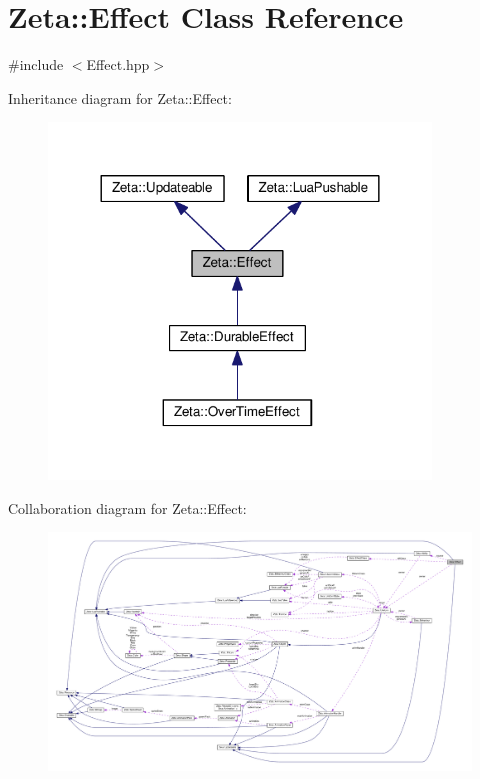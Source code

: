 \hypertarget{classZeta_1_1Effect}{\section{Zeta\+:\+:Effect Class Reference}
\label{classZeta_1_1Effect}
}


{\ttfamily \#include $<$Effect.\+hpp$>$}



Inheritance diagram for Zeta\+:\+:Effect\+:\nopagebreak
\begin{figure}[H]
\begin{center}
\leavevmode
\includegraphics[width=288pt]{classZeta_1_1Effect__inherit__graph}
\end{center}
\end{figure}


Collaboration diagram for Zeta\+:\+:Effect\+:
\nopagebreak
\begin{figure}[H]
\begin{center}
\leavevmode
\includegraphics[width=350pt]{classZeta_1_1Effect__coll__graph}
\end{center}
\end{figure}
